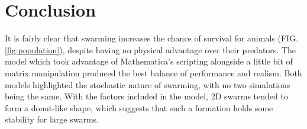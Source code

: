 \documentclass[
reprint,
showpacs,
preprintnumbers,
bibnotes,
amsmath,
amssymb,
aps,
pra,
floatfix,
]{revtex4-1}
\begin{document}
\section{\label{sec:conclusion}Conclusion}
It is fairly clear that swarming increases the chance of survival for animals (FIG. \ref{fig:population}), despite having no physical advantage over their predators.
The model which took advantage of Mathematica's scripting alongside a little bit of matrix manipulation produced the best balance of performance and realism.
Both models highlighted the stochastic nature of swarming, with no two simulations being the same.
With the factors included in the model, 2D swarms tended to form a donut-like shape, which suggests that such a formation holds some stability for large swarms.



	
	
\end{document}
